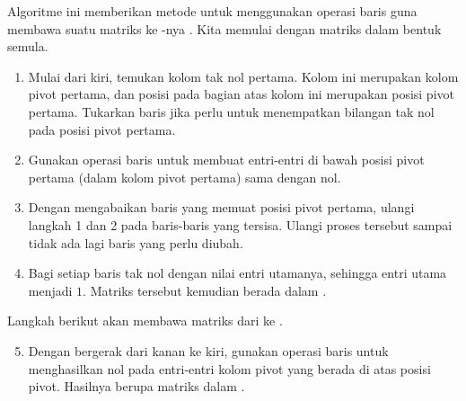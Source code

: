 \begin{algorithm}
\caption{Algoritme \RREF}
\label{algo:rrefalgorithm}

Algoritme ini memberikan metode untuk menggunakan operasi baris guna membawa suatu matriks ke
\rref-nya .
Kita memulai dengan matriks dalam bentuk semula.

\begin{enumerate}
\item Mulai dari kiri, temukan kolom tak nol pertama. Kolom ini merupakan kolom pivot
pertama, dan posisi pada bagian atas kolom ini merupakan posisi pivot
pertama. Tukarkan baris jika perlu untuk menempatkan bilangan tak nol pada
posisi pivot pertama.

\item Gunakan operasi baris untuk membuat entri-entri di bawah posisi pivot
pertama (dalam kolom pivot pertama) sama dengan nol.

\item Dengan mengabaikan baris yang memuat posisi pivot pertama, ulangi langkah 1 dan 2 pada baris-baris yang tersisa.
Ulangi proses tersebut sampai tidak ada lagi baris
yang perlu diubah.

\item Bagi setiap baris tak nol dengan nilai entri utamanya, sehingga entri utama menjadi $1$. Matriks tersebut kemudian berada dalam \ef.

\end{enumerate}
Langkah berikut akan membawa matriks dari \ef \;ke \rref.

\begin{enumerate}
\setcounter{enumi}{4}

\item Dengan bergerak dari kanan ke kiri, gunakan operasi baris untuk menghasilkan nol pada entri-entri kolom pivot yang berada di atas posisi pivot. Hasilnya
berupa matriks dalam \rref.
\end{enumerate}

\end{algorithm}

